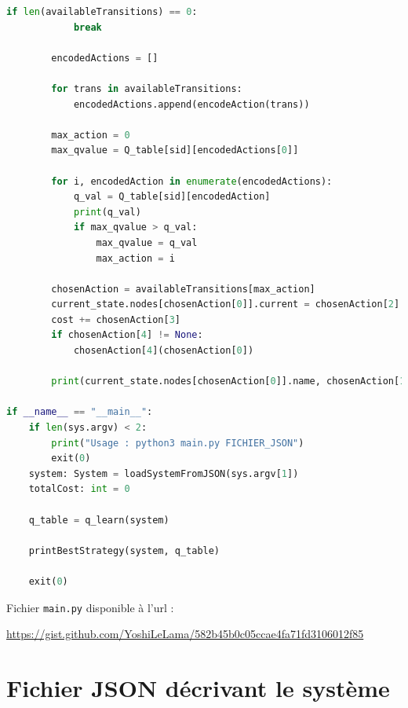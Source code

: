 \documentclass[a4paper]{article}
\begin{document}
\begin{appendices}
\begin{lstlisting}[language=python]
        if len(availableTransitions) == 0:
            break

        encodedActions = []

        for trans in availableTransitions:
            encodedActions.append(encodeAction(trans))

        max_action = 0
        max_qvalue = Q_table[sid][encodedActions[0]]

        for i, encodedAction in enumerate(encodedActions):
            q_val = Q_table[sid][encodedAction]
            print(q_val)
            if max_qvalue > q_val:
                max_qvalue = q_val 
                max_action = i

        chosenAction = availableTransitions[max_action]
        current_state.nodes[chosenAction[0]].current = chosenAction[2]
        cost += chosenAction[3]
        if chosenAction[4] != None:
            chosenAction[4](chosenAction[0])

        print(current_state.nodes[chosenAction[0]].name, chosenAction[1], chosenAction[2], chosenAction[3])
        
if __name__ == "__main__":
    if len(sys.argv) < 2:
        print("Usage : python3 main.py FICHIER_JSON")
        exit(0)
    system: System = loadSystemFromJSON(sys.argv[1])
    totalCost: int = 0

    q_table = q_learn(system)

    printBestStrategy(system, q_table)

    exit(0)
    \end{lstlisting}

    Fichier \texttt{main.py} disponible à l'url : 
    
    {\centering \href{https://gist.github.com/YoshiLeLama/582b45b0c05ccae4fa71fd3106012f85}{https://gist.github.com/YoshiLeLama/582b45b0c05ccae4fa71fd3106012f85}}

    \newpage

    \section{Fichier JSON décrivant le système}


\end{appendices}
\end{document}
